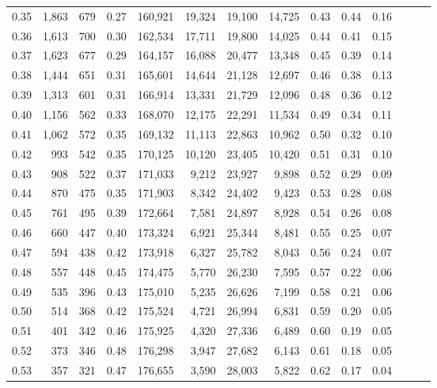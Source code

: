 \begin{tabular}{rrrrrrrrrrrrrr}
0.35 &  1,863 &  679 &  0.27 &  160,921 &   19,324 &  19,100 &  14,725 &  0.43 &  0.44 &      0.16 \\
0.36 &  1,613 &  700 &  0.30 &  162,534 &   17,711 &  19,800 &  14,025 &  0.44 &  0.41 &      0.15 \\
0.37 &  1,623 &  677 &  0.29 &  164,157 &   16,088 &  20,477 &  13,348 &  0.45 &  0.39 &      0.14 \\
0.38 &  1,444 &  651 &  0.31 &  165,601 &   14,644 &  21,128 &  12,697 &  0.46 &  0.38 &      0.13 \\
0.39 &  1,313 &  601 &  0.31 &  166,914 &   13,331 &  21,729 &  12,096 &  0.48 &  0.36 &      0.12 \\
0.40 &  1,156 &  562 &  0.33 &  168,070 &   12,175 &  22,291 &  11,534 &  0.49 &  0.34 &      0.11 \\
0.41 &  1,062 &  572 &  0.35 &  169,132 &   11,113 &  22,863 &  10,962 &  0.50 &  0.32 &      0.10 \\
0.42 &    993 &  542 &  0.35 &  170,125 &   10,120 &  23,405 &  10,420 &  0.51 &  0.31 &      0.10 \\
0.43 &    908 &  522 &  0.37 &  171,033 &    9,212 &  23,927 &   9,898 &  0.52 &  0.29 &      0.09 \\
0.44 &    870 &  475 &  0.35 &  171,903 &    8,342 &  24,402 &   9,423 &  0.53 &  0.28 &      0.08 \\
0.45 &    761 &  495 &  0.39 &  172,664 &    7,581 &  24,897 &   8,928 &  0.54 &  0.26 &      0.08 \\
0.46 &    660 &  447 &  0.40 &  173,324 &    6,921 &  25,344 &   8,481 &  0.55 &  0.25 &      0.07 \\
0.47 &    594 &  438 &  0.42 &  173,918 &    6,327 &  25,782 &   8,043 &  0.56 &  0.24 &      0.07 \\
0.48 &    557 &  448 &  0.45 &  174,475 &    5,770 &  26,230 &   7,595 &  0.57 &  0.22 &      0.06 \\
0.49 &    535 &  396 &  0.43 &  175,010 &    5,235 &  26,626 &   7,199 &  0.58 &  0.21 &      0.06 \\
0.50 &    514 &  368 &  0.42 &  175,524 &    4,721 &  26,994 &   6,831 &  0.59 &  0.20 &      0.05 \\
0.51 &    401 &  342 &  0.46 &  175,925 &    4,320 &  27,336 &   6,489 &  0.60 &  0.19 &      0.05 \\
0.52 &    373 &  346 &  0.48 &  176,298 &    3,947 &  27,682 &   6,143 &  0.61 &  0.18 &      0.05 \\
0.53 &    357 &  321 &  0.47 &  176,655 &    3,590 &  28,003 &   5,822 &  0.62 &  0.17 &      0.04 \\

\end{tabular}
